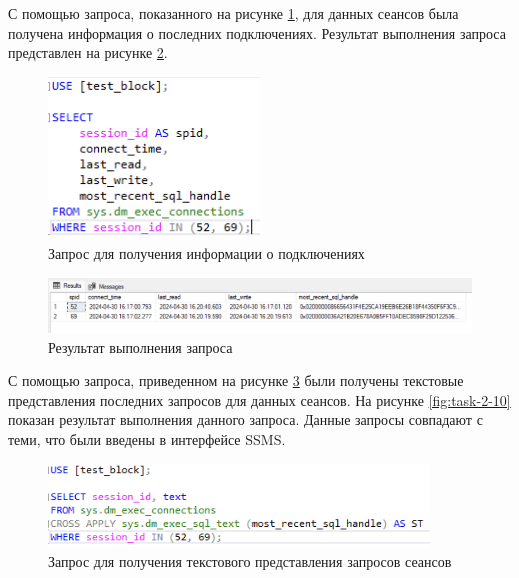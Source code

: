 \documentclass[a4paper, 14pt]{extarticle}
\begin{document}
С помощью запроса, показанного на рисунке \ref{fig:task-2-7}, для данных сеансов
была получена информация о последних подключениях. Результат выполнения запроса
представлен на рисунке \ref{fig:task-2-8}.

\begin{figure}[H]
  \centering
  \includegraphics[width=0.5\textwidth]{images/task-2/7.png}
  \caption{Запрос для получения информации о подключениях}
  \label{fig:task-2-7}
\end{figure}

\begin{figure}[H]
  \centering
  \includegraphics[width=\textwidth]{images/task-2/8.png}
  \caption{Результат выполнения запроса}
  \label{fig:task-2-8}
\end{figure}

С помощью запроса, приведенном на рисунке \ref{fig:task-2-9} были получены
текстовые представления последних запросов для данных сеансов. На рисунке
\ref{fig:task-2-10} показан результат выполнения данного запроса. Данные запросы
совпадают с теми, что были введены в интерфейсе SSMS.

\begin{figure}[H]
  \centering
  \includegraphics[width=0.9\textwidth]{images/task-2/9.png}
  \caption{Запрос для получения текстового представления запросов сеансов}
  \label{fig:task-2-9}
\end{figure}
\end{document}
